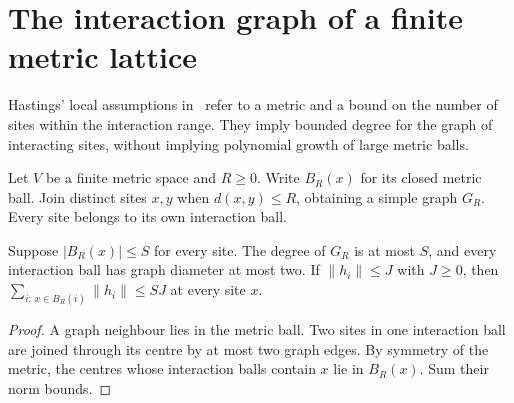 \section{The interaction graph of a finite metric lattice}
\label{sec:hastings05_metric_interaction_graph}

Hastings' local assumptions in~\cite[lines 169--190]{Hastings2006Solving}
refer to a metric and a bound on the number of sites within the interaction
range. They imply bounded degree for the graph of interacting sites, without
implying polynomial growth of large metric balls.

\begin{definition}
    \label{def:hastings05_metric_interaction_graph}
    \leanok
    Let $V$ be a finite metric space and $R\ge0$. Write $B_R(x)$ for its
    closed metric ball. Join distinct sites $x,y$ when $d(x,y)\le R$, obtaining
    a simple graph $G_R$. Every site belongs to its own interaction ball.
\end{definition}

\begin{lemma}
    \label{thm:hastings05_metric_interaction_data}
    \leanok
    Suppose $|B_R(x)|\le S$ for every site. The degree of $G_R$ is at most
    $S$, and every interaction ball has graph diameter at most two. If
    $\|h_i\|\le J$ with $J\ge0$, then
    $\sum_{i:\,x\in B_R(i)}\|h_i\|\le SJ$ at every site $x$.
\end{lemma}
\begin{proof}\leanok
    A graph neighbour lies in the metric ball. Two sites in one interaction
    ball are joined through its centre by at most two graph edges.
    By symmetry of the metric, the centres whose interaction balls contain
    $x$ lie in $B_R(x)$. Sum their norm bounds.
\end{proof}

